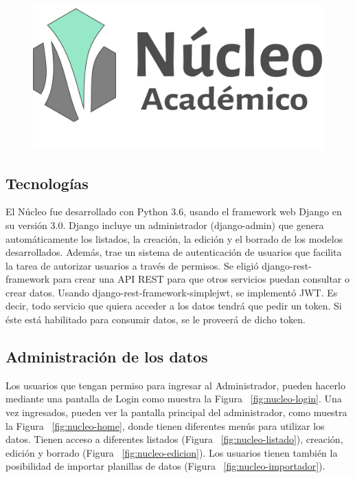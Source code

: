 \begin{figure}[h!]
  \centering
    \includegraphics[scale=0.5]{images/nucleo/nucleo-fondoblanco.png}
  \label{fig:django}
\end{figure}

\subsection{Tecnologías}

El Núcleo fue desarrollado con Python 3.6, usando el framework web Django en su versión 3.0.
Django incluye un administrador (django-admin) que genera automáticamente los listados, la creación, la edición y el borrado de los modelos desarrollados. Además, trae un sistema de autenticación de usuarios que facilita la tarea de autorizar usuarios a través de permisos.
Se eligió django-rest-framework para crear una API REST para que otros servicios puedan consultar o crear datos.
Usando django-rest-framework-simplejwt, se implementó JWT. Es decir, todo servicio que quiera acceder a los datos tendrá que pedir un token. Si éste está habilitado para consumir datos, se le proveerá de dicho token.

\subsection{Administración de los datos}

Los usuarios que tengan permiso para ingresar al Administrador, pueden hacerlo mediante una pantalla de Login como muestra la Figura ~\ref{fig:nucleo-login}.
Una vez ingresados, pueden ver la pantalla principal del administrador, como muestra la Figura ~\ref{fig:nucleo-home}, donde tienen diferentes menús para utilizar los datos. Tienen acceso a diferentes listados (Figura ~\ref{fig:nucleo-listado}), creación, edición y borrado (Figura ~\ref{fig:nucleo-edicion}).
Los usuarios tienen también la posibilidad de importar planillas de datos (Figura ~\ref{fig:nucleo-importador}).

